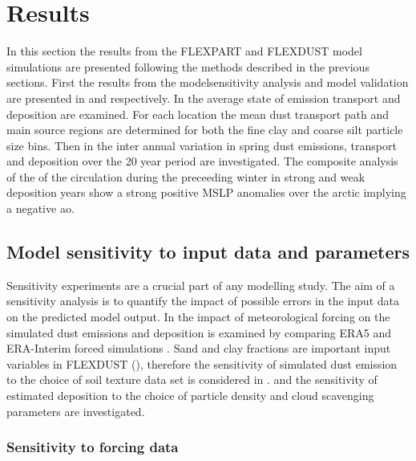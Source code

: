 \chapter{Results}\label{Chap:Results}
In this section the results from the FLEXPART and FLEXDUST model simulations are presented following the methods described in the previous sections. First the results from the modelsensitivity analysis and model validation are presented in  and  respectively. 
In   the average state of emission transport and deposition are examined. For each location the mean dust transport path and main source regions are determined for both the fine clay and coarse silt particle size bins. 
Then in  the inter annual variation in spring dust emissions, transport and deposition over the 20 year period are investigated. The composite analysis of the of the circulation during the preceeding winter in strong and weak deposition years show a strong positive MSLP anomalies over the arctic implying a negative \acrshort{ao}.   

\section{Model sensitivity to input data and parameters}\label{sec:sensitvity_experiment}
Sensitivity experiments are a crucial part of any modelling study. The aim of a sensitivity analysis is to quantify the impact of possible errors in the input data on the predicted model output. 
In  the impact of meteorological forcing on the simulated dust emissions and deposition is examined by comparing ERA5 and ERA-Interim forced simulations
. Sand and clay fractions are important input variables in FLEXDUST (), therefore the sensitivity of simulated dust emission to the choice of soil texture data set is considered in .  and  the sensitivity of estimated deposition to the choice of particle density and cloud scavenging parameters are investigated. 
\subsection{Sensitivity to forcing data}\label{sec:sens_forcing}

